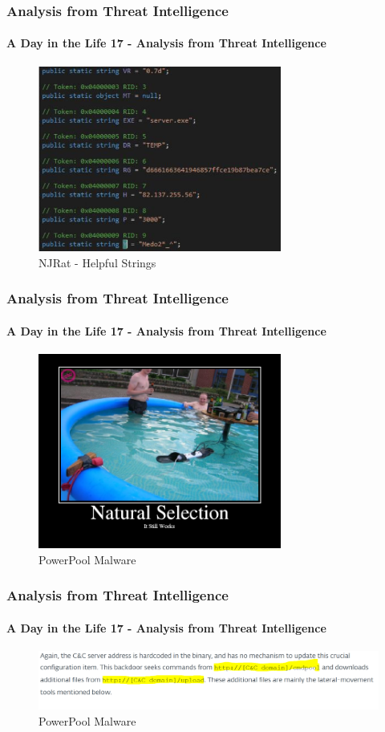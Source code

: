 \documentclass[aspectratio=169]{beamer}
\begin{document}
\begin{frame}
  \frametitle{Analysis from Threat Intelligence}
  \framesubtitle{A Day in the Life 17 - Analysis from Threat Intelligence}
  \begin{center}
    \begin{figure}
      \includegraphics[width=8cm,keepaspectratio]{njrat_strings}
      \caption{NJRat - Helpful Strings}
    \end{figure}
  \end{center}
\end{frame}

\begin{frame}
  \frametitle{Analysis from Threat Intelligence}
  \framesubtitle{A Day in the Life 17 - Analysis from Threat Intelligence}
  \begin{center}
    \begin{figure}
      \includegraphics[width=8cm,keepaspectratio]{powerpool_meme}
      \caption{PowerPool Malware}
    \end{figure}
  \end{center}
\end{frame}

\begin{frame}
  \frametitle{Analysis from Threat Intelligence}
  \framesubtitle{A Day in the Life 17 - Analysis from Threat Intelligence}
  \begin{center}
    \begin{figure}
      \includegraphics[width=14cm,keepaspectratio]{powerpool_article}
      \caption{PowerPool Malware}
    \end{figure}
  \end{center}
\end{frame}
\end{document}
